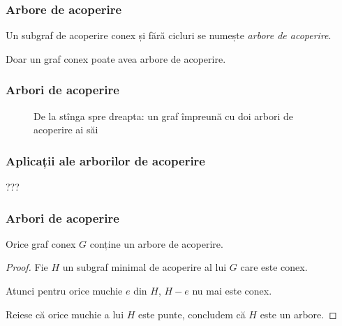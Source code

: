 \begin{frame}
  \frametitle{Arbore de acoperire}

\begin{definition}
  Un subgraf de acoperire conex și fără cicluri se numește \emph{arbore de acoperire}. 
\end{definition}

Doar un graf conex poate avea arbore de acoperire.

\end{frame}

\begin{frame}
  \frametitle{Arbori de acoperire}

\begin{figure}
\centering%
\caption{De la stînga spre dreapta: un graf împreună cu doi arbori de acoperire ai săi}
\end{figure}

\end{frame}

\begin{frame}
  \frametitle{Aplicații ale arborilor de acoperire}

???

\end{frame}



\begin{frame}
  \frametitle{Arbori de acoperire}

\begin{corollary}
Orice graf conex $G$ conține un arbore de acoperire.
\end{corollary}
\begin{proof}
Fie $H$ un subgraf minimal de acoperire al lui $G$ care este conex. 

Atunci pentru orice muchie $e$ din $H$, $H-e$ nu mai este conex. 

Reiese că orice muchie a lui $H$ este punte, concludem că $H$ este un arbore.
\end{proof}
\end{frame}

